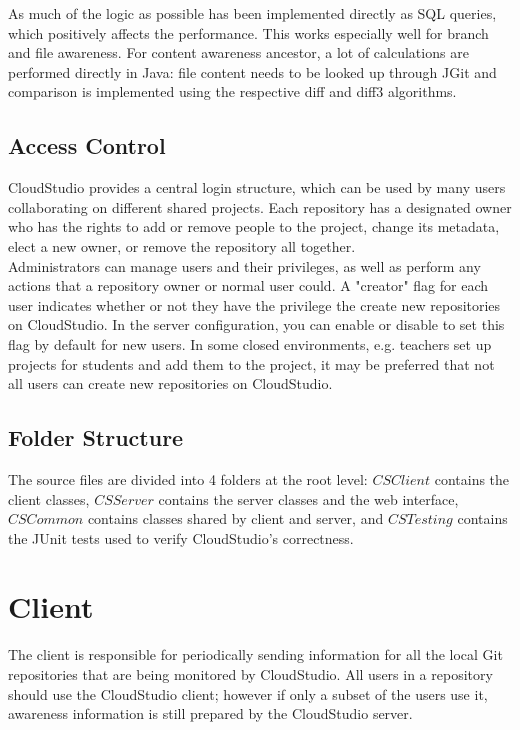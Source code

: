 As much of the logic as possible has been implemented directly as SQL queries, which positively affects the performance. This works especially well for branch and file awareness. For content awareness ancestor, a lot of calculations are performed directly in Java: file content needs to be looked up through JGit and comparison is implemented using the respective diff and diff3 algorithms.

\subsection{Access Control}

CloudStudio provides a central login structure, which can be used by many users collaborating on different shared projects. Each repository has a designated owner who has the rights to add or remove people to the project, change its metadata, elect a new owner, or remove the repository all together. \\

Administrators can manage users and their privileges, as well as perform any actions that a repository owner or normal user could. A "creator" flag for each user indicates whether or not they have the privilege the create new repositories on CloudStudio. In the server configuration, you can enable or disable to set this flag by default for new users. In some closed environments, e.g. teachers set up projects for students and add them to the project, it may be preferred that not all users can create new repositories on CloudStudio.


\subsection{Folder Structure}

The source files are divided into 4 folders at the root level: $CSClient$ contains the client classes, $CSServer$ contains the server classes and the web interface, $CSCommon$ contains classes shared by client and server, and $CSTesting$ contains the JUnit tests used to verify CloudStudio's correctness.






\section{Client}

The client is responsible for periodically sending information for all the local Git repositories that are being monitored by CloudStudio. All users in a repository should use the CloudStudio client; however if only a subset of the users use it, awareness information is still prepared by the CloudStudio server. \\

